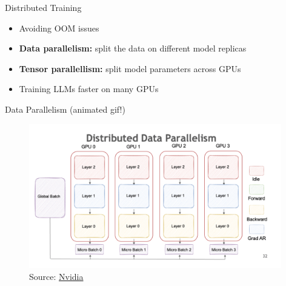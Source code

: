 
\begin{vbframe}{Distributed Training}

\vfill

\begin{itemize}
 	\item Avoiding OOM issues
	\item \textbf{Data parallelism:} split the data on different model replicas
	\item \textbf{Tensor parallellism:} split model parameters across GPUs
 	\item Training LLMs faster on many GPUs
\end{itemize}

\vfill

\end{vbframe}


\begin{vbframe}{Data Parallelism (animated gif!)}

\vfill

\begin{figure}
	\centering
	\includegraphics[width = 11cm]{./figure/data_parallel.png} \\ 
	{\footnotesize Source: \href{https://docs.nvidia.com/deeplearning/nemo/user-guide/docs/en/stable/nlp/nemo_megatron/parallelisms.html}{Nvidia}}
\end{figure}

\vfill

\end{vbframe}

